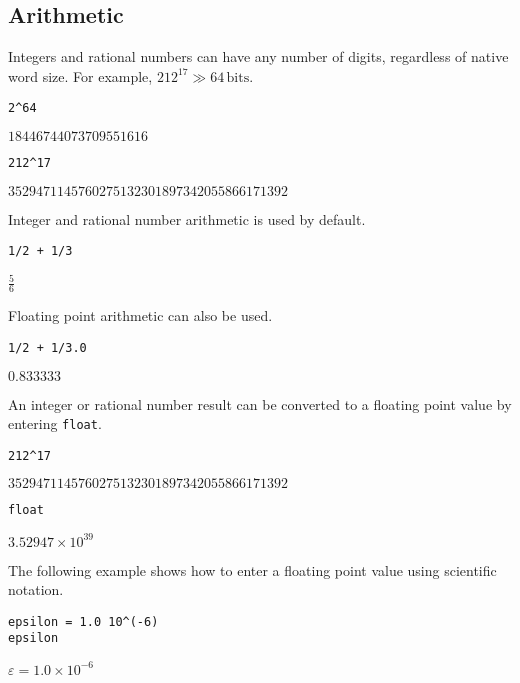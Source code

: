 \subsection{Arithmetic}

\noindent
Integers and rational numbers can have any number of digits,
regardless of native word size.
For example, $212^{17}\gg64\,\text{bits}$.

\begin{Verbatim}[formatcom=\color{blue}]
2^64
\end{Verbatim}

\noindent
$\displaystyle 18446744073709551616$

\begin{Verbatim}[formatcom=\color{blue}]
212^17
\end{Verbatim}

\noindent
$\displaystyle 3529471145760275132301897342055866171392$

\bigskip
\noindent
Integer and rational number arithmetic is used by default.

\begin{Verbatim}[formatcom=\color{blue}]
1/2 + 1/3
\end{Verbatim}

\noindent
$\displaystyle \tfrac{5}{6}$

\bigskip
\noindent
Floating point arithmetic can also be used.

\begin{Verbatim}[formatcom=\color{blue}]
1/2 + 1/3.0
\end{Verbatim}

\noindent
$\displaystyle 0.833333$

\bigskip
\noindent
An integer or rational number result can be converted to a floating
point value by entering \verb$float$.

\begin{Verbatim}[formatcom=\color{blue}]
212^17
\end{Verbatim}

\noindent
$\displaystyle 3529471145760275132301897342055866171392$

\begin{Verbatim}[formatcom=\color{blue}]
float
\end{Verbatim}

\noindent
$\displaystyle 3.52947\times10^{39}$

\bigskip
\noindent
The following example shows how to enter a floating point value
using scientific notation.

\begin{Verbatim}[formatcom=\color{blue}]
epsilon = 1.0 10^(-6)
epsilon
\end{Verbatim}

\noindent
$\displaystyle \varepsilon=1.0\times10^{-6}$
